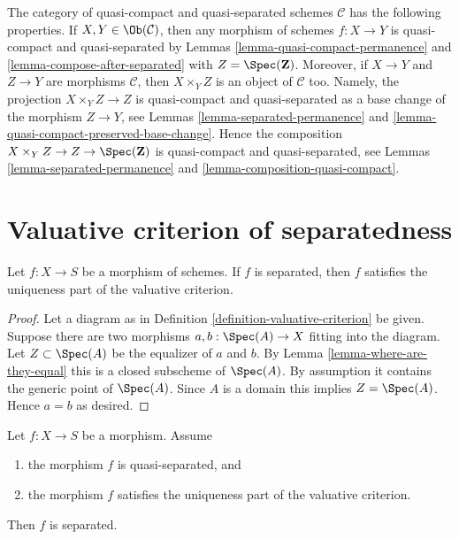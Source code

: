 \begin{remark}
\label{remark-quasi-compact-and-quasi-separated}
The category of quasi-compact and quasi-separated schemes $\mathcal{C}$
has the following properties. If $X, Y \in \Ob(\mathcal{C})$, then any
morphism of schemes $f : X \to Y$ is quasi-compact and quasi-separated by
Lemmas \ref{lemma-quasi-compact-permanence} and
\ref{lemma-compose-after-separated}
with $Z = \Spec(\mathbf{Z})$. Moreover, if $X \to Y$ and $Z \to Y$
are morphisms $\mathcal{C}$, then $X \times_Y Z$ is an object of $\mathcal{C}$
too. Namely, the projection $X \times_Y Z \to Z$ is quasi-compact and
quasi-separated as a base change of the morphism $Z \to Y$, see
Lemmas \ref{lemma-separated-permanence} and
\ref{lemma-quasi-compact-preserved-base-change}.
Hence the composition $X \times_Y Z \to Z \to \Spec(\mathbf{Z})$
is quasi-compact and quasi-separated, see
Lemmas \ref{lemma-separated-permanence} and
\ref{lemma-composition-quasi-compact}.
\end{remark}





\section{Valuative criterion of separatedness}
\label{section-valuative-separatedness}

\begin{lemma}
\label{lemma-separated-implies-valuative}
Let $f : X \to S$ be a morphism of schemes.
If $f$ is separated, then $f$ satisfies the uniqueness
part of the valuative criterion.
\end{lemma}

\begin{proof}
Let a diagram as in Definition \ref{definition-valuative-criterion}
be given. Suppose there are two morphisms
$a, b : \Spec(A) \to X$ fitting into the diagram.
Let $Z \subset \Spec(A)$ be the equalizer of $a$ and $b$.
By Lemma \ref{lemma-where-are-they-equal} this is a closed
subscheme of $\Spec(A)$. By assumption it contains
the generic point of $\Spec(A)$. Since $A$ is a domain
this implies $Z = \Spec(A)$. Hence $a = b$ as desired.
\end{proof}

\begin{lemma}
\label{lemma-valuative-criterion-separatedness}
Let $f : X \to S$ be a morphism.
Assume
\begin{enumerate}
\item the morphism $f$ is quasi-separated, and
\item the morphism $f$ satisfies the uniqueness
part of the valuative criterion.
\end{enumerate}
Then $f$ is separated.
\end{lemma}

